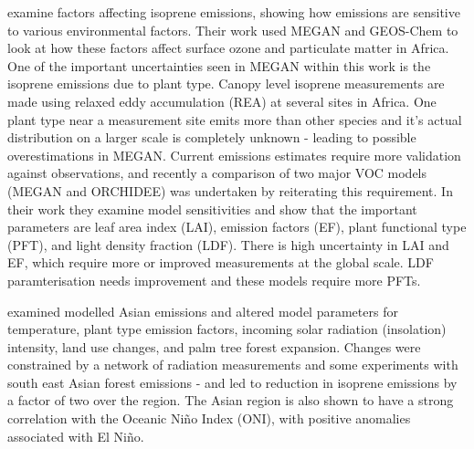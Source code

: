    \citet{Marais2014} examine factors affecting isoprene emissions, showing how emissions are sensitive to various environmental factors.
    Their work used MEGAN \citep{Guenther1995} and GEOS-Chem to look at how these factors affect surface ozone and particulate matter in Africa.
    One of the important uncertainties seen in MEGAN within this work is the isoprene emissions due to plant type. 
    Canopy level isoprene measurements are made using relaxed eddy accumulation (REA) at several sites in Africa.
    One plant type near a measurement site emits more than other species and it's actual distribution on a larger scale is completely unknown - leading to possible overestimations in MEGAN.
    Current emissions estimates require more validation against observations, and recently a comparison of two major VOC models (MEGAN and ORCHIDEE) was undertaken by \cite{Messina2016} reiterating this requirement.
    In their work they examine model sensitivities and show that the important parameters are leaf area index (LAI), emission factors (EF), plant functional type (PFT), and light density fraction (LDF).
    There is high uncertainty in LAI and EF, which require more or improved measurements at the global scale.
    LDF paramterisation needs improvement and these models require more PFTs.  
    
    \citet{Stavrakou2014} examined modelled Asian emissions and altered model parameters for temperature, plant type emission factors, incoming solar radiation (insolation) intensity, land use changes, and palm tree forest expansion.
    Changes were constrained by a network of radiation measurements and some experiments with south east Asian forest emissions - and led to reduction in isoprene emissions by a factor of two over the region.
    The Asian region is also shown to have a strong correlation with the Oceanic Niño Index (ONI), with positive anomalies associated with El Niño.
  

